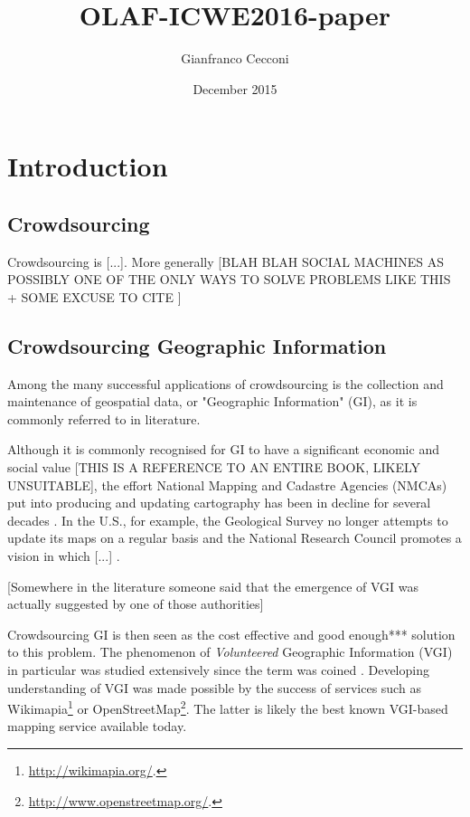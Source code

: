 \documentclass{llncs}
\title{OLAF-ICWE2016-paper}
\author{Gianfranco Cecconi}
\institute{University of Southampton \email{gc1a13@soton.ac.uk}}
\date{December 2015}
\begin{document}
\maketitle

\section{Introduction}

\subsection{Crowdsourcing}

Crowdsourcing is {[}...{]}. More generally {[}BLAH BLAH SOCIAL MACHINES AS POSSIBLY ONE OF THE ONLY WAYS TO SOLVE PROBLEMS LIKE THIS + SOME EXCUSE TO CITE \cite{OReilly:2015uo}{]}

\subsection{Crowdsourcing Geographic Information}

Among the many successful applications of crowdsourcing is the collection and maintenance of geospatial data, or "Geographic Information" (GI), as it is commonly referred to in literature.

Although it is commonly recognised for GI to have a significant economic and social value \cite{Sui:2012uf}[THIS IS A REFERENCE TO AN ENTIRE BOOK, LIKELY UNSUITABLE], the effort National Mapping and Cadastre Agencies (NMCAs) put into producing and updating cartography has been in decline for several decades \cite{ESTES:1994vz}. In the U.S., for example, the Geological Survey no longer attempts to update its maps on a regular basis and the National Research Council promotes a vision in which {[}...{]} \cite{Committee:1993vp}.

{[}Somewhere in the literature someone said that the emergence of VGI was actually suggested by one of those authorities{]}

Crowdsourcing GI is then seen as the cost effective and good enough*** solution to this problem. The phenomenon of {\it Volunteered} Geographic Information (VGI) in particular was studied extensively since the term was coined \cite{Goodchild:2007vt}. Developing understanding of VGI was made possible by the success of services such as Wikimapia\footnote{\url{http://wikimapia.org/}.} or OpenStreetMap\footnote{\url{http://www.openstreetmap.org/}.}. The latter is likely the best known VGI-based mapping service available today.
\end{document}
